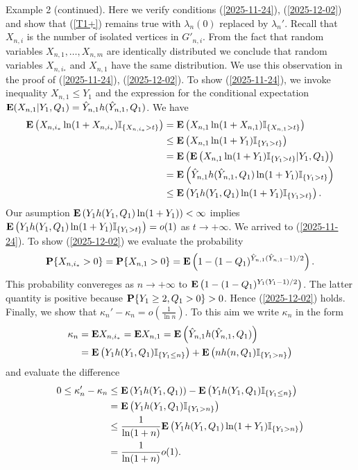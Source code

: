 \documentclass[11pt, a4paper]{article}
\newcommand{\E}{{\bf{E}}}
\newcommand{\PP}{{\bf{P}}}
\begin{document}
\medskip
Example 2 (continued). Here we verify conditions (\ref{2025-11-24}), (\ref{2025-12-02}) and show that (\ref{T1+}) remains true with $\lambda_{n}(0)$  replaced by $\lambda_{n}'$.
 Recall that $X_{n,i}$ is the number of isolated vertices in $G'_{n,i}$. From the fact that random variables $X_{n,1},\dots, X_{n,m}$ are identically distributed we conclude that random variables $X_{n,i_*}$ and $X_{n,1}$ have the same distribution.  We use  this observation in the proof of (\ref{2025-11-24}), (\ref{2025-12-02}). To show (\ref{2025-11-24}), we invoke inequality $X_{n,1}\le Y_1$ and the expression for the conditional expectation
$\E(X_{n,1}|Y_1,Q_1)={\hat Y}_{n,1}h({\hat Y}_{n,1},Q_1)$.
 We have
 \begin{align*}
 \E 
 \left(
 X_{n,i_*}\ln(1+X_{n,i_*}){\mathbb I}_{\{X_{n,i_*}>t\}}
 \right)
&
 =
 \E 
 \left(
 X_{n,1}\ln(1+X_{n,1}){\mathbb I}_{\{X_{n,1}>t\}}
 \right)
 \\
 &
 \le 
 \E 
 \left(
 X_{n,1}\ln(1+Y_1){\mathbb I}_{\{Y_1>t\}}
 \right)
 \\
 &
 =
 \E
 \left( 
 \E 
 \left(
 X_{n,1}\ln(1+Y_1){\mathbb I}_{\{Y_1>t\}}|Y_1,Q_1
 \right)
 \right)
 \\
 &
 =
 \E 
 \left(
  {\hat Y}_{n,1}h({\hat Y}_{n,1},Q_1)\ln(1+Y_1){\mathbb I}_{\{Y_1>t\}}
  \right)
 \\
 &
 \le 
 \E 
 \left(
 Y_1h(Y_1,Q_1)\ln(1+Y_1){\mathbb I}_{\{Y_1>t\}}
 \right).
 \end{align*}
Our asumption 
$
\E 
 \left(
 Y_1h(Y_1,Q_1)\ln(1+Y_1)
 \right) 
 <\infty
 $
implies
 $\E 
 \left(
 Y_1h(Y_1,Q_1)\ln(1+Y_1){\mathbb I}_{\{Y_1>t\}}
 \right)=o(1)$ as $t\to+\infty$. We arrived to 
 (\ref{2025-11-24}).
To show (\ref{2025-12-02}) we evaluate the probability
\begin{align*}
\PP\{X_{n,i_*}>0\}
=
\PP\{X_{n,1}>0\}
=
\E \left(1-(1-Q_1)^{{\hat Y}_{n,1}({\hat Y}_{n,1}-1)/2}\right).
\end{align*}
This probability convereges as $n\to+\infty$ to 
$\E \left(1-(1-Q_1)^{Y_{1}(Y_{1}-1)/2}\right)$. The latter quantity is positive because $\PP\{Y_1\ge 2, Q_1>0\}>0$. Hence 
  (\ref{2025-12-02}) holds. 
Finally, we show that $\kappa_{n}'-\kappa_{n}=o\left(\frac{1}{\ln n}\right)$. To this aim
we write $\kappa_n$ in the form
\begin{align*}
\kappa_n
&
=
\E X_{n,i_*}
=
\E X_{n,1}
=
\E 
\left(
{\hat Y}_{n,1}h({\hat Y}_{n,1},Q_1)
\right)
\\
&
=
\E 
\left(
Y_1
h(Y_1,Q_1)
{\mathbb I}_{\{Y_1\le n\}}
\right)
+
\E 
\left(nh(n,Q_{1}){\mathbb I}_{\{Y_1>n\}}
\right)
\end{align*}
and evaluate the difference
\begin{align*}
0
\le 
\kappa_n'-\kappa_n
&
\le 
\E 
\left(
Y_1h(Y_1,Q_1)
\right)
-
\E 
\left(
Y_1h(Y_1,Q_1){\mathbb I}_{\{Y_1\le n\}}
\right)
\\
&
=
\E 
\left(Y_{1}h(Y_{1},Q_{1}){\mathbb I}_{\{Y_1> n\}}
\right) 
 \\
 &
 \le 
 \frac{1}{\ln(1+n)}
 \E 
\left(
Y_1h(Y_1,Q_1)\ln(1+Y_1){\mathbb I}_{\{Y_1> n\}}
\right) 
\\
&
=\frac{1}{\ln (1+n)}o(1).
\end{align*}
 
\end{document}
